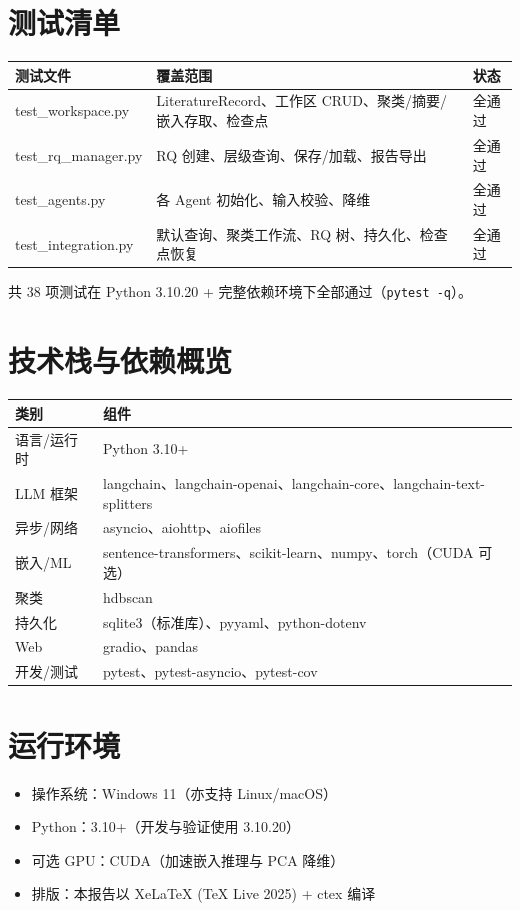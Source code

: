 \documentclass[10pt,a4paper]{article}
\begin{document}
\section{测试清单}
\begin{center}\footnotesize
\begin{tabularx}{\linewidth}{lYl}
\toprule
\textbf{测试文件} & \textbf{覆盖范围} & \textbf{状态} \\
\midrule
test\_workspace.py    & LiteratureRecord、工作区 CRUD、聚类/摘要/嵌入存取、检查点 & 全通过 \\
test\_rq\_manager.py  & RQ 创建、层级查询、保存/加载、报告导出 & 全通过 \\
test\_agents.py       & 各 Agent 初始化、输入校验、降维 & 全通过 \\
test\_integration.py  & 默认查询、聚类工作流、RQ 树、持久化、检查点恢复 & 全通过 \\
\bottomrule
\end{tabularx}
\end{center}
共 38 项测试在 Python 3.10.20 + 完整依赖环境下全部通过（\texttt{pytest -q}）。

\section{技术栈与依赖概览}
\begin{center}\footnotesize
\begin{tabularx}{\linewidth}{lY}
\toprule
\textbf{类别} & \textbf{组件} \\
\midrule
语言/运行时   & Python 3.10+ \\
LLM 框架     & langchain、langchain-openai、langchain-core、langchain-text-splitters \\
异步/网络     & asyncio、aiohttp、aiofiles \\
嵌入/ML       & sentence-transformers、scikit-learn、numpy、torch（CUDA 可选） \\
聚类          & hdbscan \\
持久化        & sqlite3（标准库）、pyyaml、python-dotenv \\
Web           & gradio、pandas \\
开发/测试     & pytest、pytest-asyncio、pytest-cov \\
\bottomrule
\end{tabularx}
\end{center}

\section{运行环境}
\begin{itemize}[leftmargin=2.2em,itemsep=0.05em]
  \item 操作系统：Windows 11（亦支持 Linux/macOS）
  \item Python：3.10+（开发与验证使用 3.10.20）
  \item 可选 GPU：CUDA（加速嵌入推理与 PCA 降维）
  \item 排版：本报告以 XeLaTeX (TeX Live 2025) + ctex 编译
\end{itemize}
\end{document}
